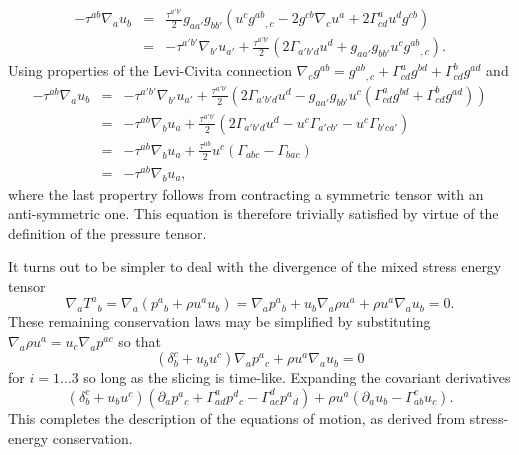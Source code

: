 \begin{eqnarray}
-\tau^{ab}\nabla_au_b & = & \frac{\tau^{a'b'}}{2} g_{aa'}g_{bb'}\left( u^{c} g^{ab}{}_{,c}  - 2g^{cb} \nabla_c u^a + 2\Gamma^a_{cd}u^dg^{cb}\right) \\
 & = & -\tau^{a'b'} \nabla_{b'} u_{a'} + \frac{\tau^{a'b'}}{2}\left( 2\Gamma_{a'b'd}u^d + g_{aa'}g_{bb'}u^cg^{ab}{}_{,c} \right).
\end{eqnarray}
Using properties of the Levi-Civita connection $\nabla_c g^{ab} = g^{ab}{}_{,c} + \Gamma^a_{cd}g^{bd} + \Gamma^b_{cd}g^{ad}$ and
\begin{eqnarray}
-\tau^{ab}\nabla_au_b & = & -\tau^{a'b'} \nabla_{b'} u_{a'} + \frac{\tau^{a'b'}}{2}\left( 2\Gamma_{a'b'd}u^d - g_{aa'}g_{bb'}u^c(\Gamma^a_{cd}g^{bd} + \Gamma^b_{cd}g^{ad}) \right)\\
& = & -\tau^{ab} \nabla_{b} u_{a} + \frac{\tau^{a'b'}}{2}\left( 2\Gamma_{a'b'd}u^d - u^c \Gamma_{a'cb'} - u^c\Gamma_{b'ca'} \right)\\
& = & -\tau^{ab} \nabla_{b} u_{a} + \frac{\tau^{ab}}{2}u^c\left( \Gamma_{abc} - \Gamma_{bac} \right)\\
& = & -\tau^{ab} \nabla_{b} u_{a},
\end{eqnarray}
where the last propertry follows from contracting a symmetric tensor with an anti-symmetric one. This equation is therefore trivially satisfied by virtue of the definition of the pressure tensor.

It turns out to be simpler to deal with the divergence of the mixed
stress energy tensor
\begin{equation}
\nabla_a T^a{}_b = \nabla_a\left( p^a{}_b + \rho u^au_b \right) =
\nabla_a p^a{}_b + u_b\nabla_a\rho u^a + \rho u^a\nabla_a u_b = 0.
\end{equation}
These remaining conservation laws may be simplified by substituting $\nabla_a \rho u^a = u_c \nabla_ap^{ac}$ so that
\begin{equation}
\left(\delta_b^c + u_bu^c\right) \nabla_a p^a{}_c + \rho u^a \nabla_a
u_b = 0
\end{equation}
for $i=1\dots 3$ so long as the slicing is time-like. Expanding the covariant derivatives
\begin{equation}
\left(\delta_b^c + u_bu^c\right) \left(\partial_a p^a{}_c +
\Gamma^a_{ad}p^d{}_c - \Gamma^d_{ac}p^a{}_d\right) + \rho u^a
\left(\partial_a u_b - \Gamma^c_{ab}u_c\right).
\end{equation}
This completes the description of the equations of motion, as derived from stress-energy conservation.
